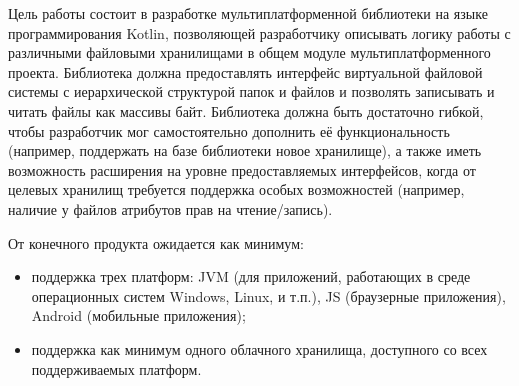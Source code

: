 
Цель работы состоит в разработке мультиплатформенной библиотеки на языке программирования Kotlin, позволяющей разработчику описывать логику работы с различными файловыми хранилищами в общем модуле мультиплатформенного проекта. Библиотека должна предоставлять интерфейс виртуальной файловой системы с иерархической структурой папок и файлов и позволять записывать и читать файлы как массивы байт. Библиотека должна быть достаточно гибкой, чтобы разработчик мог самостоятельно дополнить её функциональность (например, поддержать на базе библиотеки новое хранилище), а также иметь возможность расширения на уровне предоставляемых интерфейсов, когда от целевых хранилищ требуется поддержка особых возможностей (например, наличие у файлов атрибутов прав на чтение/запись). 

От конечного продукта ожидается как минимум:
\begin{itemize}
    \item поддержка трех платформ: JVM (для приложений, работающих в среде операционных систем Windows, Linux, и т.п.), JS (браузерные приложения), Android (мобильные приложения);
    \item поддержка как минимум одного облачного хранилища, доступного со всех поддерживаемых платформ.
\end{itemize}


